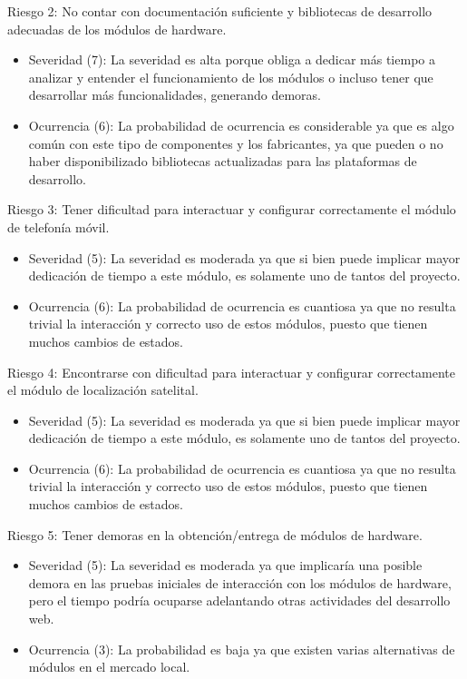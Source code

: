 \documentclass[
11pt, %
]{charter}
\begin{document}
Riesgo 2: No contar con documentación suficiente y bibliotecas de desarrollo adecuadas de los módulos de hardware.
\begin{itemize}
	\item Severidad (7):  La severidad es alta porque obliga a dedicar más tiempo a analizar y entender el funcionamiento de los módulos o incluso tener que desarrollar más funcionalidades, generando demoras.
	\item Ocurrencia (6): La probabilidad de ocurrencia es considerable ya que es algo común con este tipo de componentes y los fabricantes, ya que pueden o no haber disponibilizado bibliotecas actualizadas para las plataformas de desarrollo.
\end{itemize}

Riesgo 3: Tener dificultad para interactuar y configurar correctamente el módulo de telefonía móvil.
\begin{itemize}
	\item Severidad (5): La severidad es moderada ya que si bien puede implicar mayor dedicación de tiempo a este módulo, es solamente uno de tantos del proyecto.
	\item Ocurrencia (6): La probabilidad de ocurrencia es cuantiosa ya que no resulta trivial la interacción y correcto uso de estos módulos, puesto que tienen muchos cambios de estados.
\end{itemize}

Riesgo 4: Encontrarse con dificultad para interactuar y configurar correctamente el módulo de localización satelital.
\begin{itemize}
	\item Severidad (5): La severidad es moderada ya que si bien puede implicar mayor dedicación de tiempo a este módulo, es solamente uno de tantos del proyecto.
	\item Ocurrencia (6): La probabilidad de ocurrencia es cuantiosa ya que no resulta trivial la interacción y correcto uso de estos módulos, puesto que tienen muchos cambios de estados.
\end{itemize}

Riesgo 5: Tener demoras en la obtención/entrega de módulos de hardware.
\begin{itemize}
	\item Severidad (5): La severidad es moderada ya que implicaría una posible demora en las pruebas iniciales de interacción con los módulos de hardware, pero el tiempo podría ocuparse adelantando otras actividades del desarrollo web.
	\item Ocurrencia (3): La probabilidad es baja ya que existen varias alternativas de módulos en el mercado local.
\end{itemize}
\end{document}
